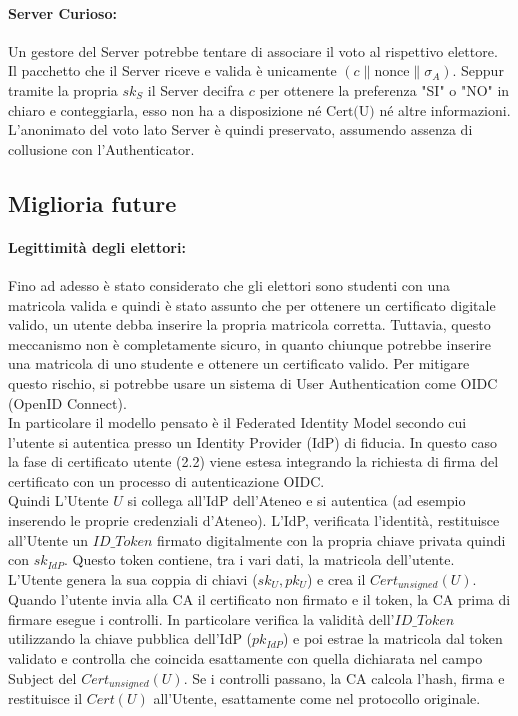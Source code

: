 \paragraph{Server Curioso:}
Un gestore del Server potrebbe tentare di associare il voto al rispettivo elettore. \\
Il pacchetto che il Server riceve e valida è unicamente $(c \| \text{nonce} \| \sigma_A)$. Seppur tramite la propria $sk_S$ il Server decifra $c$ per ottenere la preferenza "SI" o "NO" in chiaro e conteggiarla, esso non ha a disposizione né $\text{Cert(U)}$ né altre informazioni. L'anonimato del voto lato Server è quindi preservato, assumendo assenza di collusione con l'Authenticator.

\subsection{Miglioria future}

\paragraph{Legittimità degli elettori:}
Fino ad adesso è stato considerato che gli elettori sono studenti con una matricola valida e quindi è stato assunto che per ottenere un certificato digitale valido, un utente debba inserire la propria matricola corretta. Tuttavia, questo meccanismo non è completamente sicuro, in quanto chiunque potrebbe inserire una matricola di uno studente e ottenere un certificato valido. Per mitigare questo rischio, si potrebbe usare un sistema di User Authentication come OIDC (OpenID Connect).\\
In particolare il modello pensato è il Federated Identity Model secondo cui l'utente si autentica presso un Identity Provider (IdP) di fiducia. In questo caso la fase di certificato utente (2.2) viene estesa integrando la richiesta di firma del certificato con un processo di autenticazione OIDC.\\
Quindi L'Utente $U$ si collega all'IdP dell'Ateneo e si autentica (ad esempio inserendo le proprie credenziali d'Ateneo). L'IdP, verificata l'identità, restituisce all'Utente un $ID\_Token$ firmato digitalmente con la propria chiave privata quindi con $sk_{IdP}$. Questo token contiene, tra i vari dati, la matricola dell'utente.\\
L'Utente genera la sua coppia di chiavi ($sk_U, pk_U$) e crea il $Cert_{unsigned}(U)$. Quando l'utente invia alla CA il certificato non firmato e il token, la CA prima di firmare esegue i controlli. In particolare verifica la validità dell'$ID\_Token$ utilizzando la chiave pubblica dell'IdP ($pk_{IdP}$) e poi estrae la matricola dal token validato e controlla che coincida esattamente con quella dichiarata nel campo Subject del $Cert_{unsigned}(U)$. Se i controlli passano, la CA calcola l'hash, firma e restituisce il $Cert(U)$ all'Utente, esattamente come nel protocollo originale.
